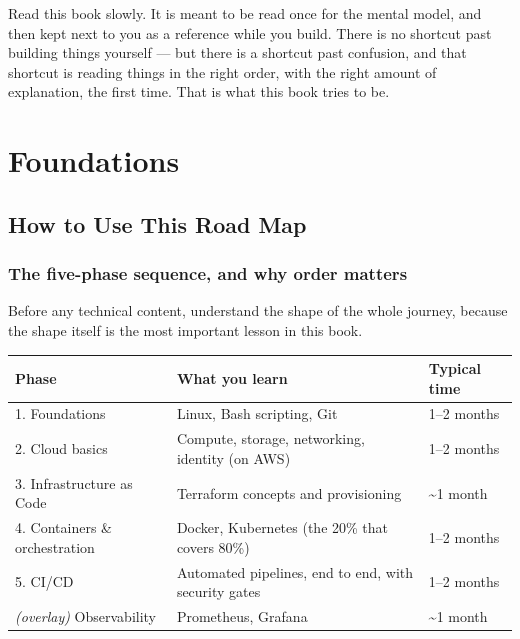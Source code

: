 \documentclass[11pt,twoside,openright]{book}
\begin{document}
Read this book slowly. It is meant to be read once for the mental model, and then kept
next to you as a reference while you build. There is no shortcut past building things
yourself --- but there is a shortcut past confusion, and that shortcut is reading things in
the right order, with the right amount of explanation, the first time. That is what this
book tries to be.

\tableofcontents

\mainmatter

\part{Foundations}

\chapter{How to Use This Road Map}

\section{The five-phase sequence, and why order matters}

Before any technical content, understand the shape of the whole journey, because the
shape itself is the most important lesson in this book.

\begin{center}
\begin{tabularx}{\textwidth}{|l|X|l|}
\hline
\textbf{Phase} & \textbf{What you learn} & \textbf{Typical time} \\
\hline
1. Foundations & Linux, Bash scripting, Git & 1--2 months \\
\hline
2. Cloud basics & Compute, storage, networking, identity (on AWS) & 1--2 months \\
\hline
3. Infrastructure as Code & Terraform concepts and provisioning & \textasciitilde 1 month \\
\hline
4. Containers \& orchestration & Docker, Kubernetes (the 20\% that covers 80\%) & 1--2 months \\
\hline
5. CI/CD & Automated pipelines, end to end, with security gates & 1--2 months \\
\hline
\emph{(overlay)} Observability & Prometheus, Grafana & \textasciitilde 1 month \\
\hline
\end{tabularx}
\end{center}
\end{document}
